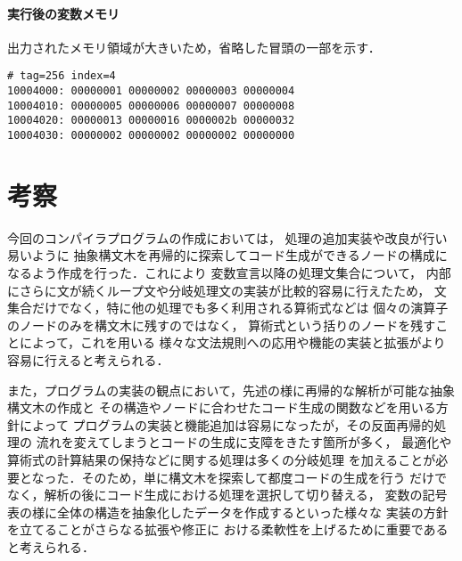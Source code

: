 \paragraph*{実行後の変数メモリ}
出力されたメモリ領域が大きいため，省略した冒頭の一部を示す．

\begin{Verbatim}[numbers=none, frame=single,
  fontsize=\small, baselinestretch=0.8]
# tag=256 index=4
10004000: 00000001 00000002 00000003 00000004
10004010: 00000005 00000006 00000007 00000008
10004020: 00000013 00000016 0000002b 00000032
10004030: 00000002 00000002 00000002 00000000
\end{Verbatim}


\section{考察}
今回のコンパイラプログラムの作成においては，
処理の追加実装や改良が行い易いように
抽象構文木を再帰的に探索してコード生成ができるノードの構成に
なるよう作成を行った．これにより
変数宣言以降の処理文集合について，
内部にさらに文が続くループ文や分岐処理文の実装が比較的容易に行えたため，
文集合だけでなく，特に他の処理でも多く利用される算術式などは
個々の演算子のノードのみを構文木に残すのではなく，
算術式という括りのノードを残すことによって，これを用いる
様々な文法規則への応用や機能の実装と拡張がより容易に行えると考えられる．

また，プログラムの実装の観点において，先述の様に再帰的な解析が可能な抽象構文木の作成と
その構造やノードに合わせたコード生成の関数などを用いる方針によって
プログラムの実装と機能追加は容易になったが，その反面再帰的処理の
流れを変えてしまうとコードの生成に支障をきたす箇所が多く，
最適化や算術式の計算結果の保持などに関する処理は多くの分岐処理
を加えることが必要となった．そのため，単に構文木を探索して都度コードの生成を行う
だけでなく，解析の後にコード生成における処理を選択して切り替える，
変数の記号表の様に全体の構造を抽象化したデータを作成するといった様々な
実装の方針を立てることがさらなる拡張や修正に
おける柔軟性を上げるために重要であると考えられる．



